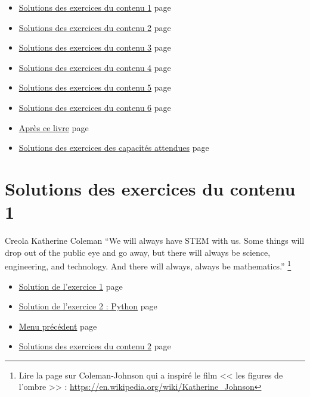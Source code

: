 \documentclass[a4paper,11pt]{book}
\begin{document}
\label{orgd150cd0}
\label{page:sols-contents-menu}
\begin{itemize}
\item \hyperref[orgdc6a2eb]{Solutions des exercices du contenu 1} page \pageref{page:sec8.1sols-cont1}
\item \hyperref[org56f3479]{Solutions des exercices du contenu 2} page \pageref{page:sec8.2sols-cont2}
\item \hyperref[org76d02b6]{Solutions des exercices du contenu 3} page \pageref{page:sec8.3sols-cont3}
\item \hyperref[org74bc845]{Solutions des exercices du contenu 4} page \pageref{page:sec8.4sols-cont4}
\item \hyperref[orge89e966]{Solutions des exercices du contenu 5} page \pageref{page:sec8.5sols-cont5}
\item \hyperref[org4cedc13]{Solutions des exercices du contenu 6} page \pageref{page:sec8.6sols-cont6}
\item \hyperref[org16db6b7]{Après ce livre} page \pageref{page:sec7after}
\item \hyperref[orgd241bdf]{Solutions des exercices des capacités attendues} page
\pageref{page:sec9sols-capacities}
\end{itemize}




\clearpage

\chapter{Solutions des exercices du contenu 1}
\label{sec:org9b4c6c5}
\label{orgdc6a2eb}


\label{page:sec8.1sols-cont1}

\begin{myquote}{Creola Katherine Coleman}
\enquote{We will always have STEM with us. Some things will drop out of the
public eye and go away, but there will always be science,
engineering, and technology. And there will always, always be
mathematics.}
\footnote{Lire la page sur Coleman-Johnson qui a inspiré le film
<< les figures de l'ombre >> : \url{https://en.wikipedia.org/wiki/Katherine_Johnson}}
\end{myquote}


\clearpage

\label{orgecd4f02}
\label{page:sols-cont1-menu}
\begin{itemize}
\item \hyperref[org51c56ef]{Solution de l'exercice 1} page \pageref{page:sec8.1.1sol1}
\item \hyperref[orged5d56d]{Solution de l'exercice 2 : Python} page \pageref{page:sec8.1.2sol2}
\item \hyperref[orgd150cd0]{Menu précédent} page \pageref{page:sols-contents-menu}
\item \hyperref[org56f3479]{Solutions des exercices du contenu 2} page \pageref{page:sec8.2sols-cont2}
\end{itemize}
\end{document}
